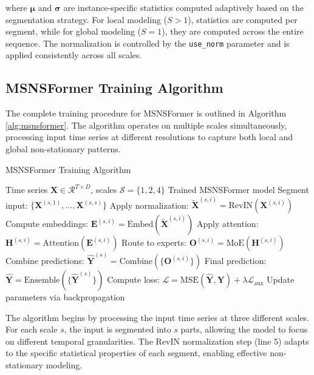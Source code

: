 \documentclass{article}
\begin{document}
where $\boldsymbol{\mu}$ and $\boldsymbol{\sigma}$ are instance-specific statistics computed adaptively based on the segmentation strategy. For local modeling ($S > 1$), statistics are computed per segment, while for global modeling ($S = 1$), they are computed across the entire sequence. The normalization is controlled by the \texttt{use\_norm} parameter and is applied consistently across all scales.

\subsection{MSNSFormer Training Algorithm}
The complete training procedure for MSNSFormer is outlined in Algorithm \ref{alg:msnsformer}. The algorithm operates on multiple scales simultaneously, processing input time series at different resolutions to capture both local and global non-stationary patterns.

\begin{algorithm}[t]
\caption{MSNSFormer Training Algorithm}
\label{alg:msnsformer}
\begin{algorithmic}[1]
\REQUIRE Time series $\mathbf{X} \in \mathcal{R}^{T \times D}$, scales $\mathcal{S} = \{1, 2, 4\}$
\ENSURE Trained MSNSFormer model
    \STATE Segment input: $\{\mathbf{X}^{(s,1)}, \ldots, \mathbf{X}^{(s,s)}\}$
        \STATE Apply normalization: $\tilde{\mathbf{X}}^{(s,i)} = \text{RevIN}(\mathbf{X}^{(s,i)})$
        \STATE Compute embeddings: $\mathbf{E}^{(s,i)} = \text{Embed}(\tilde{\mathbf{X}}^{(s,i)})$
        \STATE Apply attention: $\mathbf{H}^{(s,i)} = \text{Attention}(\mathbf{E}^{(s,i)})$
        \STATE Route to experts: $\mathbf{O}^{(s,i)} = \text{MoE}(\mathbf{H}^{(s,i)})$
    \ENDFOR
    \STATE Combine predictions: $\hat{\mathbf{Y}}^{(s)} = \text{Combine}(\{\mathbf{O}^{(s,i)}\})$
\ENDFOR
\STATE Final prediction: $\hat{\mathbf{Y}} = \text{Ensemble}(\{\hat{\mathbf{Y}}^{(s)}\})$
\STATE Compute loss: $\mathcal{L} = \text{MSE}(\hat{\mathbf{Y}}, \mathbf{Y}) + \lambda \mathcal{L}_{\text{aux}}$
\STATE Update parameters via backpropagation
\end{algorithmic}
\end{algorithm}

The algorithm begins by processing the input time series at three different scales. For each scale $s$, the input is segmented into $s$ parts, allowing the model to focus on different temporal granularities. The RevIN normalization step (line 5) adapts to the specific statistical properties of each segment, enabling effective non-stationary modeling.
\end{document}
